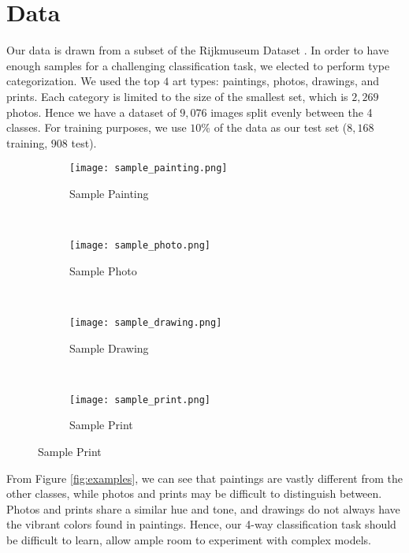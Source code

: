 \documentclass{article}
\begin{document}


\section{Data}
\label{sec:data}
Our data is drawn from a subset of the Rijkmuseum Dataset \cite{Rijksmuseum}.
In order to have enough samples for a challenging classification task, we
elected to perform type categorization. We used the top $4$ art types: paintings,
photos, drawings, and prints. Each category is limited to the size of the
smallest set, which is $2,269$ photos. Hence we have a dataset of $9,076$ images
split evenly between the 4 classes. For training purposes, we use $10$\% of the
data as our test set ($8,168$ training, $908$ test).

 \begin{figure}[h!]
   \caption{Class Examples}
   \vspace{-5pt}
   \label{fig:examples}
   \begin{subfigure}[b]{0.23\textwidth}
     \centering
     \texttt{[image: sample\_painting.png]}
     \caption{Sample Painting}
     \label{fig:painting}
   \end{subfigure}
   ~
   \begin{subfigure}[b]{0.23\textwidth}
     \centering
     \texttt{[image: sample\_photo.png]}
     \caption{Sample Photo}
     \label{fig:photo}
   \end{subfigure}
   ~
   \begin{subfigure}[b]{0.23\textwidth}
     \centering
     \texttt{[image: sample\_drawing.png]}
     \caption{Sample Drawing}
     \label{fig:drawing}
   \end{subfigure}
   ~
   \begin{subfigure}[b]{0.23\textwidth}
     \centering
     \texttt{[image: sample\_print.png]}
     \caption{Sample Print}
     \label{fig:print}
   \end{subfigure}
 \end{figure}

From Figure \ref{fig:examples}, we can see that paintings are vastly different
from the other classes, while photos and prints may be difficult to distinguish
between. Photos and prints share a similar hue and tone, and drawings do not
always have the vibrant colors found in paintings. Hence, our 4-way
classification task should be difficult to learn, allow ample room to experiment
with complex models.
\end{document}
